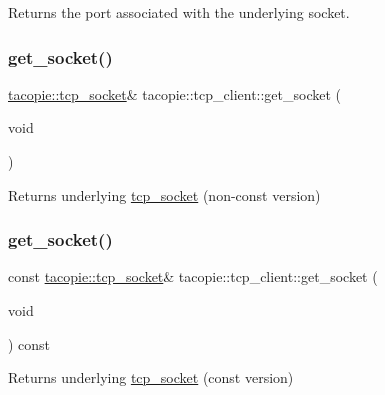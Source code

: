 \begin{DoxyReturn}{Returns}
the port associated with the underlying socket. 
\end{DoxyReturn}
\mbox{\label{classtacopie_1_1tcp__client_a1a3834deb1d263ec5816066f74286298}} 
\subsubsection{\texorpdfstring{get\+\_\+socket()}{get\_socket()}\hspace{0.1cm}{\footnotesize\ttfamily [1/2]}}
{\footnotesize\ttfamily \hyperlink{classtacopie_1_1tcp__socket}{tacopie\+::tcp\+\_\+socket}\& tacopie\+::tcp\+\_\+client\+::get\+\_\+socket (\begin{DoxyParamCaption}\item[{void}]{ }\end{DoxyParamCaption})}

\begin{DoxyReturn}{Returns}
underlying \hyperlink{classtacopie_1_1tcp__socket}{tcp\+\_\+socket} (non-\/const version) 
\end{DoxyReturn}
\mbox{\label{classtacopie_1_1tcp__client_a9cf1f3ccf43f9a0a883a17b15e3668d6}} 
\subsubsection{\texorpdfstring{get\+\_\+socket()}{get\_socket()}\hspace{0.1cm}{\footnotesize\ttfamily [2/2]}}
{\footnotesize\ttfamily const \hyperlink{classtacopie_1_1tcp__socket}{tacopie\+::tcp\+\_\+socket}\& tacopie\+::tcp\+\_\+client\+::get\+\_\+socket (\begin{DoxyParamCaption}\item[{void}]{ }\end{DoxyParamCaption}) const}

\begin{DoxyReturn}{Returns}
underlying \hyperlink{classtacopie_1_1tcp__socket}{tcp\+\_\+socket} (const version) 
\end{DoxyReturn}
\mbox{\label{classtacopie_1_1tcp__client_a9bf568812c8350260843842e7952c8c3}} 
